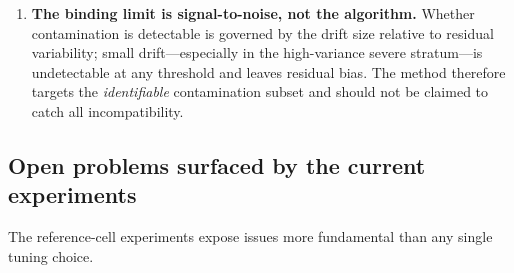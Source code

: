 \documentclass[11pt]{article}
\begin{document}
\begin{enumerate}
    \item \textbf{The binding limit is signal-to-noise, not the algorithm.} Whether contamination is detectable is governed by the drift size relative to residual variability; small drift---especially in the high-variance severe stratum---is undetectable at any threshold and leaves residual bias. The method therefore targets the \emph{identifiable} contamination subset and should not be claimed to catch all incompatibility.
\end{enumerate}

\subsection{Open problems surfaced by the current experiments}\label{sec:openproblems}

The reference-cell experiments expose issues more fundamental than any single tuning choice.
\end{document}

